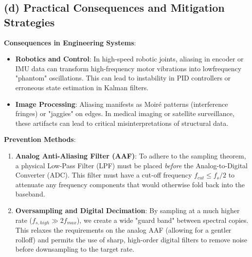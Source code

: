 \subsection*{(d) Practical Consequences and Mitigation Strategies}
\textbf{Consequences in Engineering Systems}:
\begin{itemize}
 \item \textbf{Robotics and Control}: In high-speed robotic joints, aliasing in
encoder or IMU data can transform high-frequency motor vibrations into lowfrequency "phantom" oscillations. This can lead to instability in PID controllers or
erroneous state estimation in Kalman filters.
 \item \textbf{Image Processing}: Aliasing manifests as Moiré patterns (interference
fringes) or "jaggies" on edges. In medical imaging or satellite surveillance, these
artifacts can lead to critical misinterpretations of structural data.
\end{itemize}
\textbf{Prevention Methods}:
\begin{enumerate}
 \item \textbf{Analog Anti-Aliasing Filter (AAF)}: To adhere to the sampling theorem,
a physical Low-Pass Filter (LPF) must be placed \textit{before} the Analog-to-Digital
Converter (ADC). This filter must have a cut-off frequency $f_{cut} \le f_s/2$ to
attenuate any frequency components that would otherwise fold back into the
baseband.
 \item \textbf{Oversampling and Digital Decimation}: By sampling at a much higher
rate ($f_{s, high} \gg 2f_{max}$), we create a wide "guard band" between spectral
copies. This relaxes the requirements on the analog AAF (allowing for a gentler rolloff) and permits the use of sharp, high-order digital filters to remove noise before
downsampling to the target rate.
\end{enumerate}